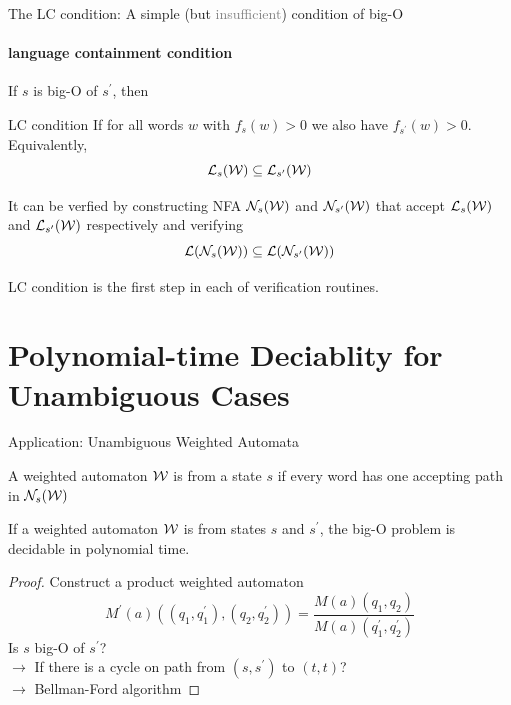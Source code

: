 \documentclass[aspectratio=169]{beamer}
\begin{document}
\begin{frame}{The LC condition: A simple  (but \textcolor{gray}{insufficient}) condition of big-O}
    \framesubtitle{language containment condition}
    If $s$ is big-O of $s^\prime$, then
    \begin{block}{LC condition}
        If for all words $w$ with $f_s(w) > 0$ we also have $f_{s^\prime} (w)>0$. Equivalently,
        $${\cal L}_s{(\cal W)} \subseteq {\cal L}_{s^\prime}{(\cal W)} $$
    \end{block}
    It can be verfied by constructing NFA ${\cal N}_s{(\cal W)}$ and ${\cal N}_{s^\prime}{(\cal W)}$ that accept ${\cal L}_s{(\cal W)}$ and ${\cal L}_{s^\prime}{(\cal W)}$ respectively and verifying 
    $${\cal L}({{\cal N}_s{(\cal W)}}) \subseteq {\cal L}({\cal N}_{s^\prime}{(\cal W)})$$

    \begin{block}{}
        LC condition is the first step in each of verification routines.
    \end{block}    
\end{frame}

\section{Polynomial-time Deciablity for Unambiguous Cases}
\begin{frame}{Application: Unambiguous Weighted Automata}
    \begin{definition}
        A weighted automaton $\cal W$ is  from a state $s$ if every word has  one accepting path in ${{\cal N}_s{(\cal W)}}$
    \end{definition}
    If a weighted automaton $\cal W$ is  from states $s$ and $s^\prime$, the big-O problem is decidable in polynomial time.

    \begin{proof}
        Construct a product weighted automaton $$M^\prime(a)((q_1,q_1^\prime),(q_2,q_2^\prime)) = \frac{M(a)(q_1,q_2)}{M(a)(q_1^\prime,q_2^\prime)}$$
        Is $s$ big-O of $s^\prime$? \\
        $\to$ If there is a cycle on path from $(s,s^\prime)$ to $(t,t)$? \\
        $\to$ Bellman-Ford algorithm
    \end{proof}
\end{frame}
\end{document}
